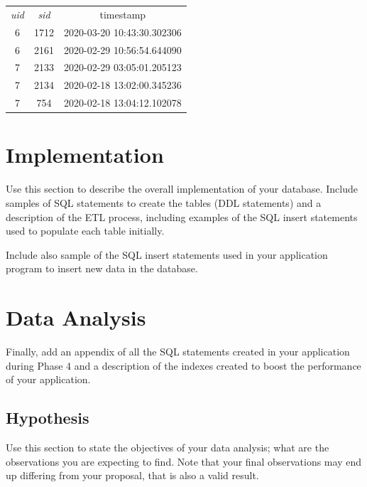 \documentclass[12pt]{article}
\begin{document}
    \\~\\

    \begin{center}
        \begin{tabular}{ |c|c|c| }
            \hline
            \rowcolor{tablegrey} \multicolumn{3}{|c|}{Play} \\
            \hline
            \emph{uid} & \emph{sid} & timestamp \\
            \hline
            6 & 1712 & 2020-03-20 10:43:30.302306 \\
            \hline
            6 & 2161 & 2020-02-29 10:56:54.644090 \\
            \hline
            7 & 2133 & 2020-02-29 03:05:01.205123 \\
            \hline
            7 & 2134 & 2020-02-18 13:02:00.345236 \\
            \hline
            7 & 754 & 2020-02-18 13:04:12.102078 \\
            \hline
        \end{tabular}
    \end{center}



    \section{Implementation}
    Use this section to describe the overall implementation of your database.
    Include samples of SQL statements to create the tables (DDL statements) and
    a description of the ETL process, including examples of the SQL insert statements
    used to populate each table initially.

    Include also sample of the SQL insert statements used in your application program
    to insert new data in the database.
    \section{Data Analysis}
    Finally, add an appendix of all the SQL statements
    created in your application during Phase 4 and a description of the indexes created to
    boost the performance of your application.
    \subsection{Hypothesis}
    Use this section to state the objectives of your data analysis; what are the observations you are expecting to find. Note that your final
    observations may end up differing from your proposal, that is also a valid result.
\end{document}

